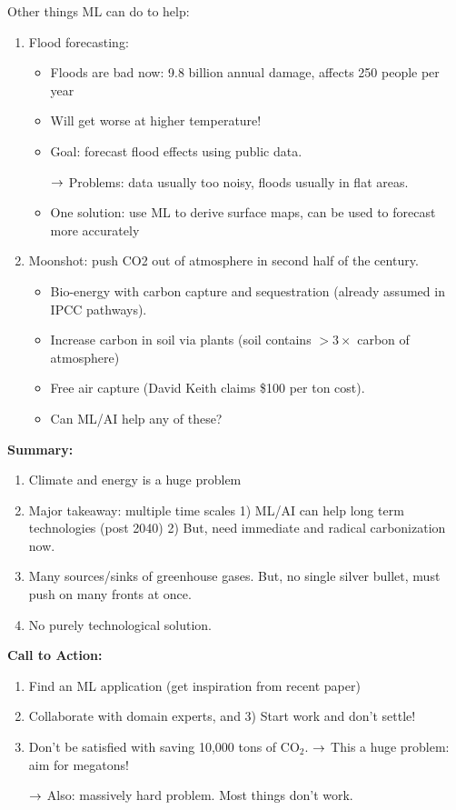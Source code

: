 Other things ML can do to help:
\begin{enumerate}
    \item Flood forecasting:
    \begin{itemize}
        \item Floods are bad now: 9.8 billion annual damage, affects 250 people per year
        \item Will get worse at higher temperature!
        \item Goal: forecast flood effects using public data.
        
        $\rightarrow$ Problems: data usually too noisy, floods usually in flat areas.
        
        \item One solution: use ML to derive surface maps, can be used to forecast more accurately
    \end{itemize}
    \item Moonshot: push CO2 out of atmosphere in second half of the century.
    \begin{itemize}
        \item Bio-energy with carbon capture and sequestration (already assumed in IPCC pathways).
        \item Increase carbon in soil via plants (soil contains $>3\times$ carbon of atmosphere)
        \item Free air capture (David Keith claims \$100 per ton cost).
        \item Can ML/AI help any of these?
    \end{itemize}
\end{enumerate}


{\bf Summary:}
\begin{enumerate}
    \item Climate and energy is a huge problem
    \item Major takeaway: multiple time scales
        1) ML/AI can help long term technologies (post 2040)
        2) But, need immediate and radical carbonization now.
    \item Many sources/sinks of greenhouse gases. But, no single silver bullet, must push on many fronts at once.
    \item No purely technological solution.
\end{enumerate}


{\bf Call to Action:}
\begin{enumerate}
    \item Find an ML application (get inspiration from recent paper)
    \item Collaborate with domain experts, and 3) Start work and don't settle!
    \item Don't be satisfied with saving 10,000 tons of CO$_2$.
    $\rightarrow$ This a huge problem: aim for megatons!

    $\rightarrow$ Also: massively hard problem. Most things don't work.
\end{enumerate}

